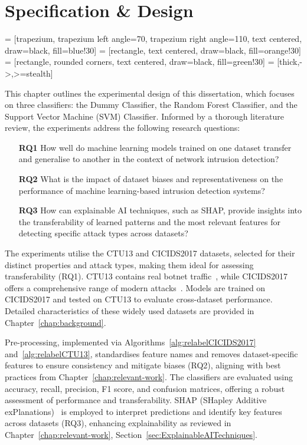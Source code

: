 \chapter{Specification \& Design}\label{chap:specification-design}

 = [trapezium, trapezium left angle=70, trapezium right angle=110, text centered, draw=black, fill=blue!30]
 = [rectangle, text centered, draw=black, fill=orange!30]
 = [rectangle, rounded corners, text centered, draw=black, fill=green!30]
 = [thick,->,>=stealth]

This chapter outlines the experimental design of this dissertation, which focuses on three classifiers: the Dummy Classifier, the Random Forest Classifier, and the Support Vector Machine (SVM) Classifier. Informed by a thorough literature review, the experiments address the following research questions:

\begin{enumerate}
    \item[\textbf{RQ1}] How well do machine learning models trained on one dataset transfer and generalise to another in the context of network intrusion detection?
    \item[\textbf{RQ2}] What is the impact of dataset biases and representativeness on the performance of machine learning-based intrusion detection systems?
    \item[\textbf{RQ3}] How can explainable AI techniques, such as SHAP, provide insights into the transferability of learned patterns and the most relevant features for detecting specific attack types across datasets?
\end{enumerate}

The experiments utilise the CTU13 and CICIDS2017 datasets, selected for their distinct properties and attack types, making them ideal for assessing transferability (RQ1). CTU13 contains real botnet traffic~\cite{garcia2014empirical}, while CICIDS2017 offers a comprehensive range of modern attacks~\cite{sharafaldin2018toward}. Models are trained on CICIDS2017 and tested on CTU13 to evaluate cross-dataset performance. Detailed characteristics of these widely used datasets are provided in Chapter~\ref{chap:background}.

Pre-processing, implemented via Algorithms~\ref{alg:relabelCICIDS2017} and~\ref{alg:relabelCTU13}, standardises feature names and removes dataset-specific features to ensure consistency and mitigate biases (RQ2), aligning with best practices from Chapter~\ref{chap:relevant-work}. The classifiers are evaluated using accuracy, recall, precision, F1 score, and confusion matrices, offering a robust assessment of performance and transferability. SHAP (SHapley Additive exPlanations)~\cite{lundberg2017unified} is employed to interpret predictions and identify key features across datasets (RQ3), enhancing explainability as reviewed in Chapter~\ref{chap:relevant-work}, Section~\ref{sec:ExplainableAITechniques}.


